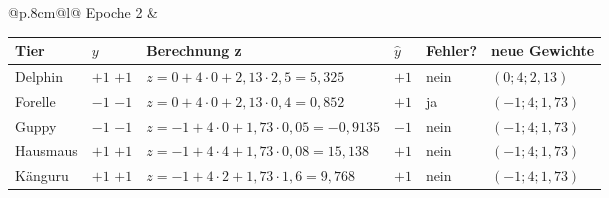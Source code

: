 \noindent\begin{tabular}{@{}p{.8cm}@{}l@{}}
\hspace{-0.5cm}\tiny{Epoche 2} &
\begin{tabular}{|>{\centering\arraybackslash}p{1.7cm}|>{\centering\arraybackslash}p{0.8cm}|p{6cm}|>{\centering\arraybackslash}p{0.8cm}|>{\centering\arraybackslash}p{1.2cm}|>{\centering\arraybackslash}p{2.4cm}|}
\hline
Tier & $y$ & Berechnung z & $\hat y$ & \small{Fehler?} & \small{neue Gewichte} \\
\hline
Delphin & \ifdefined\zeigloesungen \textcolor{loesgruen}{$+1$} \else $+1$ \fi & \ifdefined\zeigloesungen \textcolor{loesgruen}{$z = 0 + 4\cdot0 + 2{,}13\cdot2{,}5 = 5{,}325$} \fi & \ifdefined\zeigloesungen \textcolor{loesgruen}{$+1$} \fi & \ifdefined\zeigloesungen \textcolor{loesgruen}{nein} \fi & \ifdefined\zeigloesungen \textcolor{loesgruen}{$(0;4;2{,}13)$} \fi \\[8pt]
\hline
Forelle & \ifdefined\zeigloesungen \textcolor{loesgruen}{$-1$} \else $-1$ \fi & \ifdefined\zeigloesungen \textcolor{loesgruen}{$z = 0 + 4\cdot0 + 2{,}13\cdot0{,}4 = 0{,}852$} \fi & \ifdefined\zeigloesungen \textcolor{loesgruen}{$+1$} \fi & \ifdefined\zeigloesungen \textcolor{loesgruen}{ja} \fi & \ifdefined\zeigloesungen \textcolor{loesgruen}{$(-1;4;1{,}73)$} \fi \\[8pt]
\hline
Guppy & \ifdefined\zeigloesungen \textcolor{loesgruen}{$-1$} \else $-1$ \fi & \ifdefined\zeigloesungen \textcolor{loesgruen}{$z = {-1} + 4\cdot0 + 1{,}73\cdot0{,}05 = {-0{,}9135}$} \fi & \ifdefined\zeigloesungen \textcolor{loesgruen}{$-1$} \fi & \ifdefined\zeigloesungen \textcolor{loesgruen}{nein} \fi & \ifdefined\zeigloesungen \textcolor{loesgruen}{$(-1;4;1{,}73)$} \fi \\[8pt]
\hline
Hausmaus & \ifdefined\zeigloesungen \textcolor{loesgruen}{$+1$} \else $+1$ \fi & \ifdefined\zeigloesungen \textcolor{loesgruen}{$z = {-1} + 4\cdot4 + 1{,}73\cdot0{,}08 = 15{,}138$} \fi & \ifdefined\zeigloesungen \textcolor{loesgruen}{$+1$} \fi & \ifdefined\zeigloesungen \textcolor{loesgruen}{nein} \fi & \ifdefined\zeigloesungen \textcolor{loesgruen}{$(-1;4;1{,}73)$} \fi \\[8pt]
\hline
Känguru & \ifdefined\zeigloesungen \textcolor{loesgruen}{$+1$} \else $+1$ \fi & \ifdefined\zeigloesungen \textcolor{loesgruen}{$z = {-1} + 4\cdot2 + 1{,}73\cdot1{,}6 = 9{,}768$} \fi & \ifdefined\zeigloesungen \textcolor{loesgruen}{$+1$} \fi & \ifdefined\zeigloesungen \textcolor{loesgruen}{nein} \fi & \ifdefined\zeigloesungen \textcolor{loesgruen}{$(-1;4;1{,}73)$} \fi \\[8pt]
\hline
\end{tabular}
\end{tabular}
\medskip


